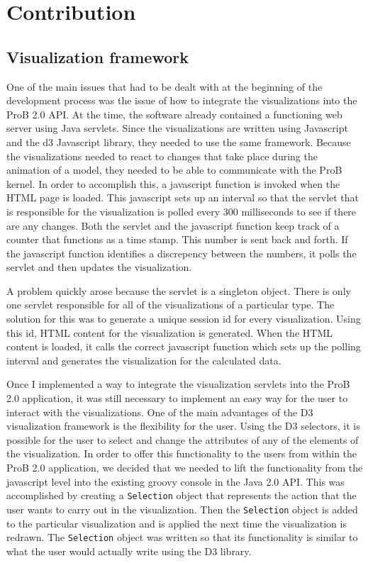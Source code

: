 \section{Contribution}

\subsection{Visualization framework}

One of the main issues that had to be dealt with at the beginning of the development process was the issue of how to integrate the visualizations into the ProB 2.0 API. At the time, the software already contained a functioning web server using Java servlets. Since the visualizations are written using Javascript and the d3 Javascript library, they needed to use the same framework. Because the visualizations needed to react to changes that take place during the animation of a model, they needed to be able to communicate with the ProB kernel. In order to accomplish this, a javascript function is invoked when the HTML page is loaded. This javascript sets up an interval so that the servlet that is responsible for the visualization is polled every 300 milliseconds to see if there are any changes. Both the servlet and the javascript function keep track of a counter that functions as a time stamp. This number is sent back and forth. If the javascript function identifies a discrepency between the numbers, it polls the servlet and then updates the visualization.

A problem quickly arose because the servlet is a singleton object. There is only one servlet responsible for all of the visualizations of a particular type. The solution for this was to generate a unique session id for every visualization. Using this id, HTML content for the visualization is generated. When the HTML content is loaded, it calls the correct javascript function which sets up the polling interval and generates the visualization for the calculated data.

Once I implemented a way to integrate the visualization servlets into the ProB 2.0 application, it was still necessary to implement an easy way for the user to interact with the visualizations. One of the main advantages of the D3 visualization framework is the flexibility for the user. Using the D3 selectors, it is possible for the user to select and change the attributes of any of the elements of the visualization. In order to offer this functionality to the users from within the ProB 2.0 application, we decided that we needed to lift the functionality from the javascript level into the existing groovy console in the Java 2.0 API. This was accomplished by creating a \texttt{Selection} object that represents the action that the user wants to carry out in the visualization. Then the \texttt{Selection} object is added to the particular visualization and is applied the next time the visualization is redrawn. The \texttt{Selection} object was written so that its functionality is similar to what the user would actually write using the D3 library.


